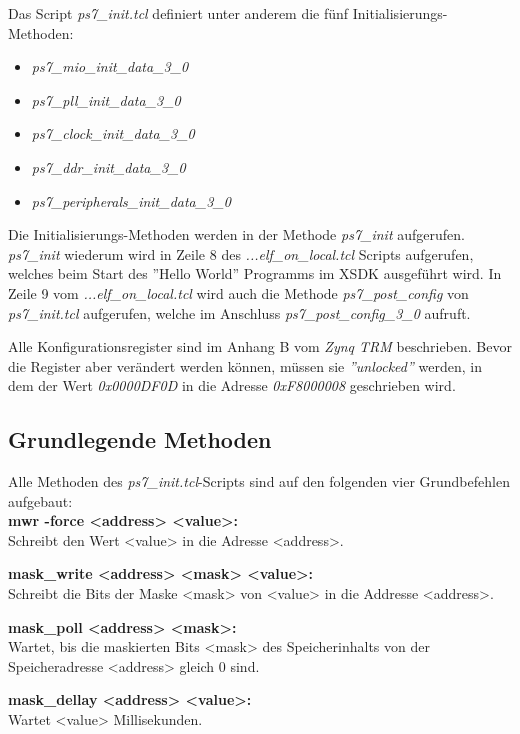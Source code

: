 Das Script \textit{ps7\_init.tcl} definiert unter anderem die fünf Initialisierungs-Methoden:
\begin{itemize}
\item \textit{ps7\_mio\_init\_data\_3\_0}
\item \textit{ps7\_pll\_init\_data\_3\_0}
\item \textit{ps7\_clock\_init\_data\_3\_0} 
\item \textit{ps7\_ddr\_init\_data\_3\_0}
\item \textit{ps7\_peripherals\_init\_data\_3\_0}
\end{itemize}
Die Initialisierungs-Methoden werden in der Methode \textit{ps7\_init} aufgerufen.
\textit{ps7\_init} wiederum wird in Zeile 8 des \textit{...elf\_on\_local.tcl} Scripts aufgerufen, welches beim Start des ''Hello World'' Programms im XSDK ausgeführt wird.
In Zeile 9 vom \textit{...elf\_on\_local.tcl} wird auch die Methode \textit{ps7\_post\_config} von \textit{ps7\_init.tcl} aufgerufen, welche im Anschluss \textit{ps7\_post\_config\_3\_0} aufruft.

Alle Konfigurationsregister sind im Anhang B vom \textit{Zynq TRM}\cite{bib:ZynqTechnicalReferenceManual} beschrieben.
Bevor die Register aber verändert werden können, müssen sie \textit{''unlocked''} werden, in dem der Wert \textit{0x0000DF0D} in die Adresse \textit{0xF8000008} geschrieben wird.


\subsection{Grundlegende Methoden}
Alle Methoden des \textit{ps7\_init.tcl}-Scripts sind auf den folgenden vier Grundbefehlen aufgebaut:\\
\textbf{mwr -force <address> <value>: }\\
Schreibt den Wert <value> in die Adresse <address>.

\textbf{mask\_write <address> <mask> <value>: }\\
Schreibt die Bits der Maske <mask> von <value> in die Addresse <address>.

\textbf{mask\_poll <address> <mask>:  }\\
Wartet, bis die maskierten Bits <mask> des Speicherinhalts von der Speicheradresse <address> gleich 0 sind.

\textbf{mask\_dellay <address> <value>:}\\
Wartet <value> Millisekunden.

